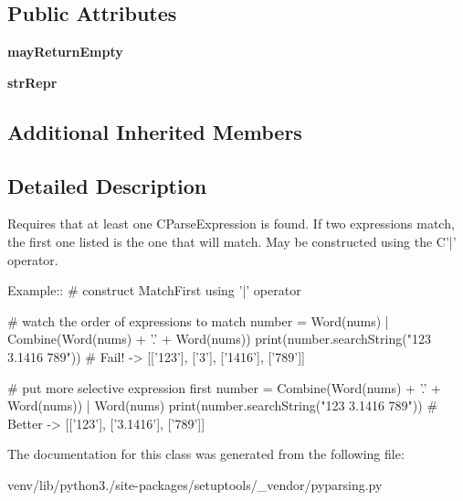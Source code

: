 \subsection*{Public Attributes}
\begin{DoxyCompactItemize}
\item 
\mbox{\label{classsetuptools_1_1__vendor_1_1pyparsing_1_1_match_first_a2f6ed66c259a38cbabf228547c89e4c7}} 
{\bfseries may\+Return\+Empty}
\item 
\mbox{\label{classsetuptools_1_1__vendor_1_1pyparsing_1_1_match_first_a78d1963e4344e706db983ccaa0aa3a2a}} 
{\bfseries str\+Repr}
\end{DoxyCompactItemize}
\subsection*{Additional Inherited Members}


\subsection{Detailed Description}
\begin{DoxyVerb}Requires that at least one C{ParseExpression} is found.
If two expressions match, the first one listed is the one that will match.
May be constructed using the C{'|'} operator.

Example::
    # construct MatchFirst using '|' operator
    
    # watch the order of expressions to match
    number = Word(nums) | Combine(Word(nums) + '.' + Word(nums))
    print(number.searchString("123 3.1416 789")) #  Fail! -> [['123'], ['3'], ['1416'], ['789']]

    # put more selective expression first
    number = Combine(Word(nums) + '.' + Word(nums)) | Word(nums)
    print(number.searchString("123 3.1416 789")) #  Better -> [['123'], ['3.1416'], ['789']]
\end{DoxyVerb}
 

The documentation for this class was generated from the following file\+:\begin{DoxyCompactItemize}
\item 
venv/lib/python3./site-\/packages/setuptools/\+\_\+vendor/pyparsing.\+py\end{DoxyCompactItemize}
